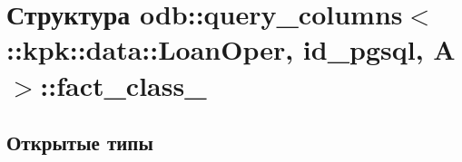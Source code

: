 \hypertarget{structodb_1_1query__columns_3_01_1_1kpk_1_1data_1_1_loan_oper_00_01id__pgsql_00_01_a_01_4_1_1fact__class__}{}\section{Структура odb\+:\+:query\+\_\+columns$<$ \+:\+:kpk\+:\+:data\+:\+:Loan\+Oper, id\+\_\+pgsql, A $>$\+:\+:fact\+\_\+class\+\_\+}
\label{structodb_1_1query__columns_3_01_1_1kpk_1_1data_1_1_loan_oper_00_01id__pgsql_00_01_a_01_4_1_1fact__class__}
\subsection*{Открытые типы}
